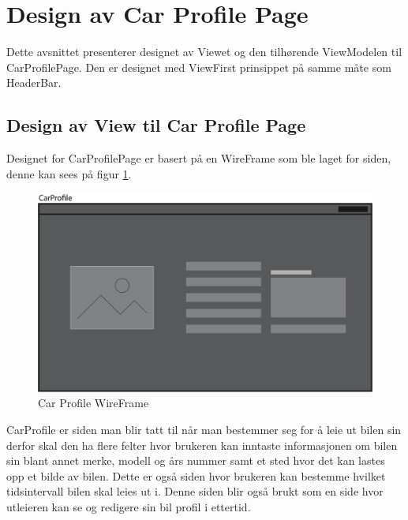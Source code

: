 \documentclass[SoftwareDesign/SoftwareDesign_main.tex]{subfiles}
\begin{document}
\section{Design av Car Profile Page}
Dette avsnittet presenterer designet av Viewet og den tilhørende ViewModelen til CarProfilePage. Den er designet med ViewFirst prinsippet på samme måte som HeaderBar.
\subsection{Design av View til Car Profile Page}
Designet for CarProfilePage er basert på en WireFrame som ble laget for siden, denne kan sees på figur \ref{fig:CarProfileWireframe}.

\begin{figure}[H]
    \centering
    \includegraphics[width=\textwidth]{SoftwareDesign/MVVMDesigns/Graphics/CarProfileWireFrame.png}
    \caption{Car Profile WireFrame}
    \label{fig:CarProfileWireframe}
\end{figure}


CarProfile er siden man blir tatt til når man bestemmer seg for å leie ut bilen sin derfor skal den ha flere felter hvor brukeren kan inntaste informasjonen om bilen sin blant annet merke, modell og års nummer samt et sted hvor det kan lastes opp et bilde av bilen. Dette er også siden hvor brukeren kan bestemme hvilket tidsintervall bilen skal leies ut i. Denne siden blir også brukt som en side hvor utleieren kan se og redigere sin bil profil i ettertid.
\end{document}
